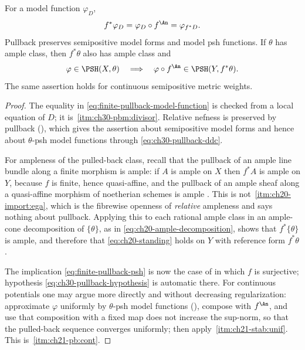 \begin{proposition}\label{prop:finite-pullback-psh}
For a model function $\varphi_D$,
\begin{equation}
\label{eq:finite-pullback-model-function}
                  f^*\varphi_D=\varphi_D\circ f^{\An}
                  =\varphi_{f^*D}.
\end{equation}
Pullback preserves semipositive model forms and model psh functions.  If
$\theta$ has ample class, then $f^*\theta$ also has ample class and
\begin{equation}
\label{eq:finite-pullback-psh}
 \varphi\in\PSH(X,\theta)
 \quad\Longrightarrow\quad
 \varphi\circ f^{\An}\in\PSH(Y,f^*\theta).
\end{equation}
The same assertion holds for continuous semipositive metric weights.
\end{proposition}

\begin{proof}
The equality in \eqref{eq:finite-pullback-model-function} is checked from a
local equation of $D$; it is
\,\cref{itm:ch30-pbm:divisor}.
Relative nefness is preserved by pullback
(), which gives the assertion about semipositive
model forms and hence about $\theta$-psh model functions through
\eqref{eq:ch30-pullback-ddc}.

For ampleness of the pulled-back class, recall that the pullback of an
ample line bundle along a finite morphism is ample: if $A$ is ample on
$X$ then $f^*A$ is ample on $Y$, because $f$ is finite, hence
quasi-affine, and the pullback of an ample sheaf along a quasi-affine
morphism of noetherian schemes is ample \cite[II, 5.1.12]{EGAII}.  This is
not \,\cref{itm:ch20-import:ega}, which is the
fibrewise openness of \emph{relative} ampleness and says nothing about
pullback.  Applying this to
each rational ample class in an ample-cone decomposition of
$\{\theta\}$, as in \eqref{eq:ch20-ample-decomposition}, shows that
$f^*\{\theta\}$ is ample, and therefore that \eqref{eq:ch20-standing} holds on $Y$ with
reference form $f^*\theta$.

The implication \eqref{eq:finite-pullback-psh} is now the case of
 in which $f$ is surjective; hypothesis
\eqref{eq:ch30-pullback-hypothesis} is automatic there.  For continuous
potentials one may argue more directly and without decreasing
regularization: approximate $\varphi$ uniformly by $\theta$-psh model
functions (), compose with $f^{\An}$, and
use that composition with a fixed map does not increase the sup-norm, so
that the pulled-back sequence converges uniformly; then apply
\,\cref{itm:ch21-stab:unif}.  This is
\,\cref{itm:ch21-pb:cont}.
\end{proof}

